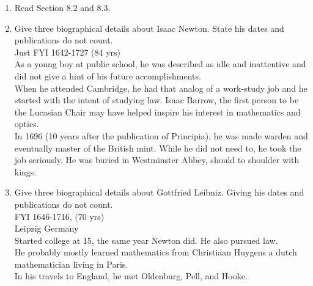 \documentclass[12pt]{article}
\begin{document}
\begin{enumerate}
\item Read Section 8.2 and 8.3.
\item Give three biographical details about Isaac Newton.  State his dates and publications do not count.\\

Just FYI 1642-1727 (84 yrs)\\
As a young boy at public school, he was described as idle and inattentive and did not give a hint of his future accomplishments.\\
When he attended Cambridge, he had that analog of a work-study job and he started with the intent of studying law. Isaac Barrow, the first person to be the Lucasian Chair may have helped inspire his interest in mathematics and optics.\\
In 1696 (10 years after the publication of Principia), he was made warden and eventually master of the British mint. While he did not need to, he took the job seriously. He was buried in Westminster Abbey, should to shoulder with kings.\\
\vfill
\item Give three biographical details about Gottfried Leibniz.  Giving his dates and publications do not count. \\
FYI 1646-1716, (70 yrs)\\
Leipzig Germany\\
Started college at 15, the same year Newton did. He also pursued law.\\
He probably mostly learned mathematics from Christiaan Huygens a dutch mathematician living in Paris.\\
In his travels to England, he met Oldenburg, Pell, and Hooke.

\vfill
\end{enumerate}
\end{document}
